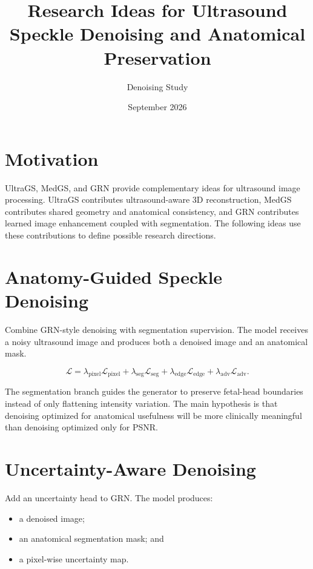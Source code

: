 \documentclass[11pt,a4paper]{article}
\title{Research Ideas for Ultrasound Speckle Denoising and Anatomical Preservation}
\author{Denoising Study}
\date{September 2026}
\begin{document}
\maketitle
\tableofcontents
\newpage

\section{Motivation}

UltraGS, MedGS, and GRN provide complementary ideas for ultrasound image processing. UltraGS contributes ultrasound-aware 3D reconstruction, MedGS contributes shared geometry and anatomical consistency, and GRN contributes learned image enhancement coupled with segmentation. The following ideas use these contributions to define possible research directions.

\section{Anatomy-Guided Speckle Denoising}

Combine GRN-style denoising with segmentation supervision. The model receives a noisy ultrasound image and produces both a denoised image and an anatomical mask.

\begin{equation}
    \mathcal{L}
    = \lambda_{\mathrm{pixel}}\mathcal{L}_{\mathrm{pixel}}
    + \lambda_{\mathrm{seg}}\mathcal{L}_{\mathrm{seg}}
    + \lambda_{\mathrm{edge}}\mathcal{L}_{\mathrm{edge}}
    + \lambda_{\mathrm{adv}}\mathcal{L}_{\mathrm{adv}}.
\end{equation}

The segmentation branch guides the generator to preserve fetal-head boundaries instead of only flattening intensity variation. The main hypothesis is that denoising optimized for anatomical usefulness will be more clinically meaningful than denoising optimized only for PSNR.

\section{Uncertainty-Aware Denoising}

Add an uncertainty head to GRN. The model produces:
\begin{itemize}
    \item a denoised image;
    \item an anatomical segmentation mask; and
    \item a pixel-wise uncertainty map.
\end{itemize}
\end{document}
